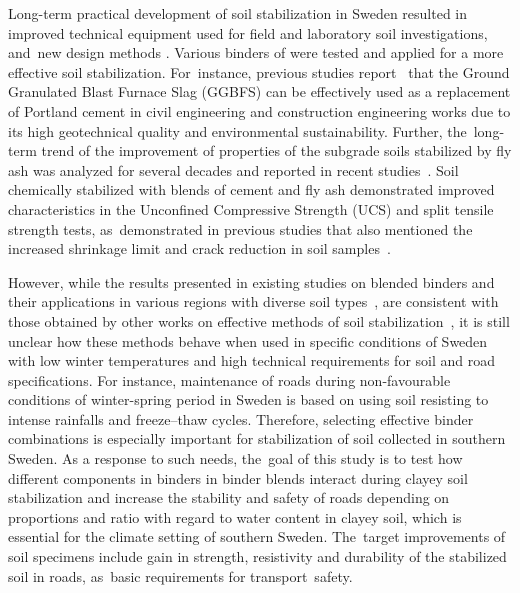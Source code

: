 \documentclass[constrmater,article,accept,pdftex,moreauthors]{Definitions/mdpi}
\begin{document}
{Long-term practical development of soil stabilization in Sweden resulted in improved technical equipment used for field and laboratory soil investigations, and~new design methods} \cite{Bjerrum}. {Various binders of were tested and applied for a more effective soil stabilization. For~instance, }previous studies report~\cite{Higgins,electronics11223726} that the Ground Granulated Blast Furnace Slag (GGBFS) can be effectively used as a replacement of Portland cement in civil engineering and construction engineering works due to its high geotechnical quality and environmental sustainability. Further, the~long-term trend of the improvement of properties of the subgrade soils stabilized by fly ash was analyzed for several decades and reported in recent studies~\cite{Parsons}. Soil chemically stabilized with blends of cement and fly ash demonstrated improved characteristics in the Unconfined Compressive Strength (UCS) and split tensile strength tests, as~demonstrated in previous studies that also mentioned the increased shrinkage limit and crack reduction in soil samples~\cite{Olgun}.

However, while the results presented in existing studies on blended binders and their applications in various regions with diverse soil types~\cite{Jie,Holz,Jamnongpipatkul}, are consistent with those obtained by other works on effective methods of soil stabilization~\cite{Moh}, it is still unclear how these methods behave when used in specific conditions of Sweden with low winter temperatures and high technical requirements for soil and road specifications. {For instance, maintenance of roads during non-favourable conditions of winter-spring period in Sweden is based on using soil resisting to intense rainfalls and freeze--thaw cycles. Therefore, selecting effective binder combinations is especially important for stabilization of soil collected in southern Sweden.} As a response to such needs, the~goal of this study is to test how different components in binders in binder blends interact during {clayey }soil stabilization and increase the stability and safety of roads depending on proportions and ratio with regard to water content{ in clayey soil, which is essential for the climate setting of southern Sweden}. The~target improvements of soil specimens include gain in strength, resistivity and durability of the stabilized soil in roads, as~basic requirements for transport~safety.
\end{document}
